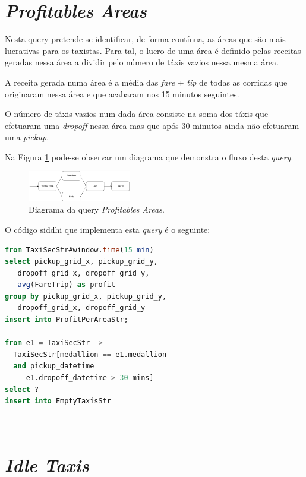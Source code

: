 \documentclass[article]{IEEEtran}
\begin{document}
\section{\textit{Profitables Areas}}

Nesta query pretende-se identificar, de forma contínua, as áreas que são mais lucrativas para os taxistas. Para tal, o lucro de uma área é definido pelas receitas geradas nessa área a dividir pelo número de táxis vazios nessa mesma área.

A receita gerada numa área é a média das \textit{fare} + \textit{tip} de todas as corridas que originaram nessa área e que acabaram nos 15 minutos seguintes.

O número de táxis vazios num dada área consiste na soma dos táxis que efetuaram uma \textit{dropoff} nessa área mas que após 30 minutos ainda não efetuaram uma \textit{pickup}.

Na Figura \ref{fig:profitablesAreasDiagram} pode-se observar um diagrama que demonstra o fluxo desta \textit{query}.

\begin{figure}[hbtp]
    \centering
        \includegraphics[width=0.4\textwidth]{images/profitableAreasDiagram}
    \caption{Diagrama da query \textit{Profitables Areas}.}
    \label{fig:profitablesAreasDiagram}
\end{figure}

O código siddhi que implementa esta \textit{query} é o seguinte:

\begin{lstlisting}[language=SQL]
from TaxiSecStr#window.time(15 min)
select pickup_grid_x, pickup_grid_y,
   dropoff_grid_x, dropoff_grid_y,
   avg(FareTrip) as profit
group by pickup_grid_x, pickup_grid_y,
   dropoff_grid_x, dropoff_grid_y
insert into ProfitPerAreaStr;

from e1 = TaxiSecStr ->
  TaxiSecStr[medallion == e1.medallion 
  and pickup_datetime 
   - e1.dropoff_datetime > 30 mins]
select ? 
insert into EmptyTaxisStr

 
\end{lstlisting}

\section{\textit{Idle Taxis}}
\end{document}
